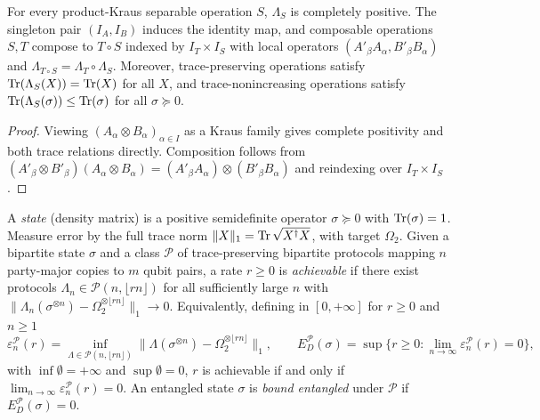 \begin{lemma}
\label{lem:sep-op-comp}
\leanok
{}
For every product-Kraus separable operation $S$, $\Lambda_S$ is completely positive. The singleton pair $(I_A, I_B)$ induces the identity map, and composable operations $S, T$ compose to $T\circ S$ indexed by $I_T\times I_S$ with local operators $(A'_\beta A_\alpha, B'_\beta B_\alpha)$ and $\Lambda_{T\circ S} = \Lambda_T\circ\Lambda_S$. Moreover, trace-preserving operations satisfy $\operatorname{Tr}(\Lambda_S(X))=\operatorname{Tr}(X)$ for all $X$, and trace-nonincreasing operations satisfy $\operatorname{Tr}(\Lambda_S(\sigma))\le\operatorname{Tr}(\sigma)$ for all $\sigma\succeq 0$.
\end{lemma}
\begin{proof}
\leanok
Viewing $(A_\alpha\otimes B_\alpha)_{\alpha\in I}$ as a Kraus family gives complete positivity and both trace relations directly. Composition follows from $(A'_\beta\otimes B'_\beta)(A_\alpha\otimes B_\alpha) = (A'_\beta A_\alpha)\otimes(B'_\beta B_\alpha)$ and reindexing over $I_T\times I_S$.
\end{proof}

A \emph{state} (density matrix) is a positive semidefinite operator $\sigma\succeq 0$ with $\operatorname{Tr}(\sigma)=1$. Measure error by the full trace norm $\|X\|_1 = \operatorname{Tr}\sqrt{X^{\dagger}X}$, with target $\Omega_2$. Given a bipartite state $\sigma$ and a class $\mathcal{P}$ of trace-preserving bipartite protocols mapping $n$ party-major copies to $m$ qubit pairs, a rate $r\ge 0$ is \emph{achievable} if there exist protocols $\Lambda_n\in\mathcal{P}(n,\lfloor rn\rfloor)$ for all sufficiently large $n$ with $\|\Lambda_n(\sigma^{\otimes n}) - \Omega_2^{\otimes\lfloor rn\rfloor}\|_1 \to 0$. Equivalently, defining in $[0,+\infty]$ for $r\ge 0$ and $n\ge 1$
\[
  \varepsilon_n^{\mathcal{P}}(r) = \inf_{\Lambda\in\mathcal{P}(n,\lfloor rn\rfloor)}
  \big\|\Lambda(\sigma^{\otimes n}) - \Omega_2^{\otimes\lfloor rn\rfloor}\big\|_1,
  \qquad
  E_D^{\mathcal{P}}(\sigma) = \sup\big\{r\ge 0 : \lim_{n\to\infty}\varepsilon_n^{\mathcal{P}}(r)=0\big\},
\]
with $\inf\emptyset = +\infty$ and $\sup\emptyset = 0$, $r$ is achievable if and only if $\lim_{n\to\infty}\varepsilon_n^{\mathcal{P}}(r)=0$. An entangled state $\sigma$ is \emph{bound entangled} under $\mathcal{P}$ if $E_D^{\mathcal{P}}(\sigma)=0$.

